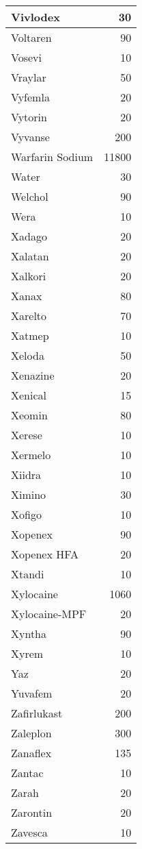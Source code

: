 \documentclass[
]{article}
\begin{document}
\begin{table}
\begin{tabular}[t]{l|r}
\hline
Vivlodex & 30\\
\hline
Voltaren & 90\\
\hline
Vosevi & 10\\
\hline
Vraylar & 50\\
\hline
Vyfemla & 20\\
\hline
Vytorin & 20\\
\hline
Vyvanse & 200\\
\hline
Warfarin Sodium & 11800\\
\hline
Water & 30\\
\hline
Welchol & 90\\
\hline
Wera & 10\\
\hline
Xadago & 20\\
\hline
Xalatan & 20\\
\hline
Xalkori & 20\\
\hline
Xanax & 80\\
\hline
Xarelto & 70\\
\hline
Xatmep & 10\\
\hline
Xeloda & 50\\
\hline
Xenazine & 20\\
\hline
Xenical & 15\\
\hline
Xeomin & 80\\
\hline
Xerese & 10\\
\hline
Xermelo & 10\\
\hline
Xiidra & 10\\
\hline
Ximino & 30\\
\hline
Xofigo & 10\\
\hline
Xopenex & 90\\
\hline
Xopenex HFA & 20\\
\hline
Xtandi & 10\\
\hline
Xylocaine & 1060\\
\hline
Xylocaine-MPF & 20\\
\hline
Xyntha & 90\\
\hline
Xyrem & 10\\
\hline
Yaz & 20\\
\hline
Yuvafem & 20\\
\hline
Zafirlukast & 200\\
\hline
Zaleplon & 300\\
\hline
Zanaflex & 135\\
\hline
Zantac & 10\\
\hline
Zarah & 20\\
\hline
Zarontin & 20\\
\hline
Zavesca & 10\\

\end{tabular}
\end{table}
\end{document}

